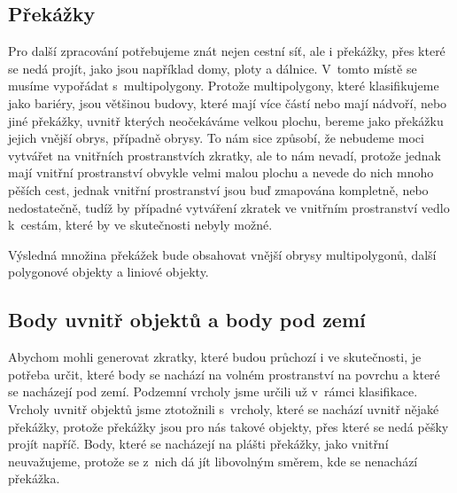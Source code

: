 \subsection{Překážky}
Pro další zpracování potřebujeme znát nejen cestní síť, ale i překážky, přes
které se nedá projít, jako jsou například domy, ploty a dálnice. V~tomto místě
se musíme vypořádat s~multipolygony. Protože multipolygony, které klasifikujeme
jako bariéry, jsou většinou budovy, které mají více částí nebo mají nádvoří,
nebo jiné překážky, uvnitř kterých neočekáváme velkou plochu, bereme
jako překážku jejich vnější obrys, případně obrysy. To nám sice způsobí, že
nebudeme moci vytvářet na vnitřních prostranstvích zkratky, ale to nám nevadí,
protože jednak mají vnitřní prostranství obvykle velmi malou plochu a nevede do
nich mnoho pěších cest, jednak vnitřní prostranství jsou buď zmapována
kompletně, nebo nedostatečně, tudíž by případné vytváření zkratek ve vnitřním
prostranství vedlo k~cestám, které by ve skutečnosti nebyly možné.

Výsledná množina překážek bude obsahovat vnější obrysy multipolygonů, další
polygonové objekty a liniové objekty.

\subsection{Body uvnitř objektů a body pod zemí}
Abychom mohli generovat zkratky, které budou průchozí i ve skutečnosti, je
potřeba určit, které body se nachází na volném prostranství na povrchu a které
se nacházejí pod zemí. Podzemní vrcholy jsme určili už v~rámci klasifikace.
Vrcholy uvnitř objektů jsme ztotožnili s~vrcholy, které se nachází uvnitř nějaké
překážky, protože překážky jsou pro nás takové objekty, přes které se nedá pěšky
projít napříč. Body, které se nacházejí na plášti překážky, jako vnitřní
neuvažujeme, protože se z~nich dá jít libovolným směrem, kde se nenachází
překážka.

